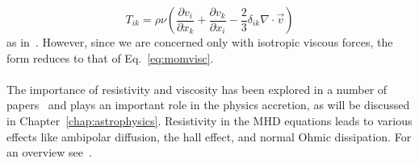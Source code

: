 \begin{equation}
  T_{ik}=\rho\nu\left(\frac{\partial v_i}{\partial x_k}+\frac{\partial v_k}{\partial x_i}-\frac23\delta_{ik}\nabla\cdot\vec v\right)
\end{equation}
as in~\cite{Fromang2007b}. However, since we are concerned only with isotropic viscous forces, the form reduces to that of Eq.~\ref{eq:momvisc}. \\
\\
The importance of resistivity and viscosity has been explored in a number of papers~\cite{Fromang2007b,Lesur2007,Gammie1996} and plays an important role in the physics accretion, as will be discussed in Chapter~\ref{chap:astrophysics}. Resistivity in the MHD equations leads to various effects like ambipolar diffusion, the hall effect, and normal Ohmic dissipation. For an overview see~\citet{KunzNonIdeal}.


